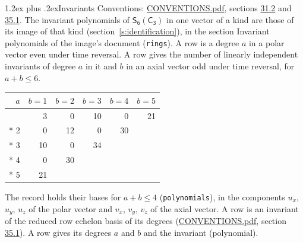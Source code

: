 \documentclass[10pt,a4paper]{article}
\makeatletter
\renewcommand\section{\@startsection{section}{1}{\z@}{-3ex plus -1ex minus -.2ex}%
  {1.2ex plus .2ex}{\normalfont\large\sffamily\bfseries\color{parttitle}}}
\numberwithin{equation}{section}
\newcommand{\grp}[1]{\mathsf{#1}}
\makeatother
\begin{document}
\section{Invariants}\label{s:invariants}
Conventions: \href{../../CONVENTIONS.pdf}{CONVENTIONS.pdf}, sections \href{../../CONVENTIONS.pdf\#conv.31.2}{31.2} and \href{../../CONVENTIONS.pdf\#conv.35.1}{35.1}.
The invariant polynomials of $\grp{S_{6}}(\grp{C_{3}})$ in one vector of a kind are those of its image of that kind (section~\ref{s:identification}), in the section Invariant polynomials of the image's document (\texttt{rings}).
\leavevmode\label{n:index.degree.polar}\label{n:index.degree.axial}A row is a degree $a$ in a polar vector even under time reversal. A row gives the number of linearly independent invariants of degree $a$ in it and $b$ in an axial vector odd under time reversal, for $a + b \le 6$.
{\small\begin{longtable}{@{}rrrrrr@{}}\toprule
$a$ & $b = 1$ & $b = 2$ & $b = 3$ & $b = 4$ & $b = 5$\\\midrule\endhead
\bottomrule\endfoot\endlastfoot
1 & 3 & 0 & 10 & 0 & 21\\*
2 & 0 & 12 & 0 & 30 & \\*
3 & 10 & 0 & 34 &  & \\*
4 & 0 & 30 &  &  & \\*
5 & 21 &  &  &  & \\
\bottomrule\end{longtable}}
\leavevmode\label{n:local.component.polar}\label{n:local.component.axial}The record holds their bases for $a + b \le 4$ (\texttt{polynomials}), in the components $u_{x}$, $u_{y}$, $u_{z}$ of the polar vector and $v_{x}$, $v_{y}$, $v_{z}$ of the axial vector. \label{n:head.polynomial}A row is an invariant of the reduced row echelon basis of its degrees (\href{../../CONVENTIONS.pdf}{CONVENTIONS.pdf}, section \href{../../CONVENTIONS.pdf\#conv.35.1}{35.1}). A row gives its degrees $a$ and $b$ and the invariant (polynomial).
\end{document}

